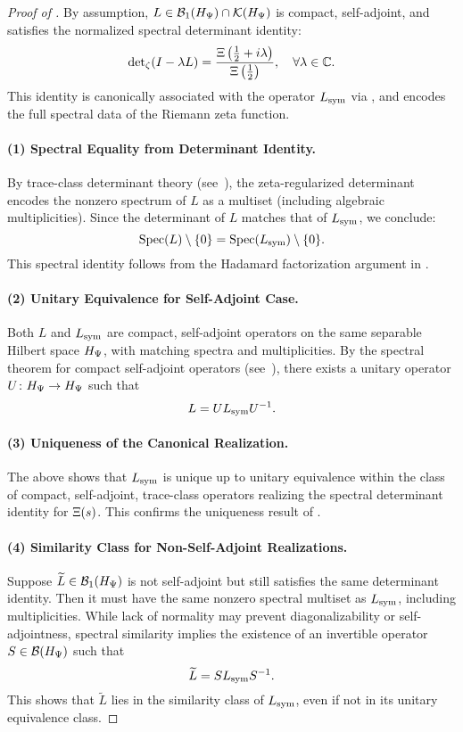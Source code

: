 \begin{proof}[Proof of ]
By assumption, \( L \in \mathcal{B}_1(H_{\Psi}) \cap \mathcal{K}(H_{\Psi}) \) is compact, self-adjoint, and satisfies the normalized spectral determinant identity:
\[
\det\nolimits_\zeta(I - \lambda L) = \frac{\Xi\left(\tfrac{1}{2} + i\lambda\right)}{\Xi\left(\tfrac{1}{2}\right)}, \quad \forall \lambda \in \mathbb{C}.
\]
This identity is canonically associated with the operator \( L_{\mathrm{sym}} \) via , and encodes the full spectral data of the Riemann zeta function.

\paragraph{(1) Spectral Equality from Determinant Identity.}
By trace-class determinant theory (see~\cite[Theorem~4.2]{Simon2005TraceIdeals}), the zeta-regularized determinant encodes the nonzero spectrum of \( L \) as a multiset (including algebraic multiplicities). Since the determinant of \( L \) matches that of \( L_{\mathrm{sym}} \), we conclude:
\[
\operatorname{Spec}(L) \setminus \{0\} = \operatorname{Spec}(L_{\mathrm{sym}}) \setminus \{0\}.
\]
This spectral identity follows from the Hadamard factorization argument in .

\paragraph{(2) Unitary Equivalence for Self-Adjoint Case.}
Both \( L \) and \( L_{\mathrm{sym}} \) are compact, self-adjoint operators on the same separable Hilbert space \( H_{\Psi} \), with matching spectra and multiplicities. By the spectral theorem for compact self-adjoint operators (see~\cite[Theorem~VI.16]{ReedSimon1980I}), there exists a unitary operator \( U \colon H_{\Psi} \to H_{\Psi} \) such that
\[
L = U L_{\mathrm{sym}} U^{-1}.
\]

\paragraph{(3) Uniqueness of the Canonical Realization.}
The above shows that \( L_{\mathrm{sym}} \) is unique up to unitary equivalence within the class of compact, self-adjoint, trace-class operators realizing the spectral determinant identity for \( \Xi(s) \). This confirms the uniqueness result of .

\paragraph{(4) Similarity Class for Non-Self-Adjoint Realizations.}
Suppose \( \widetilde{L} \in \mathcal{B}_1(H_{\Psi}) \) is not self-adjoint but still satisfies the same determinant identity. Then it must have the same nonzero spectral multiset as \( L_{\mathrm{sym}} \), including multiplicities. While lack of normality may prevent diagonalizability or self-adjointness, spectral similarity implies the existence of an invertible operator \( S \in \mathcal{B}(H_{\Psi}) \) such that
\[
\widetilde{L} = S L_{\mathrm{sym}} S^{-1}.
\]
This shows that \( \widetilde{L} \) lies in the similarity class of \( L_{\mathrm{sym}} \), even if not in its unitary equivalence class.


\end{proof}

